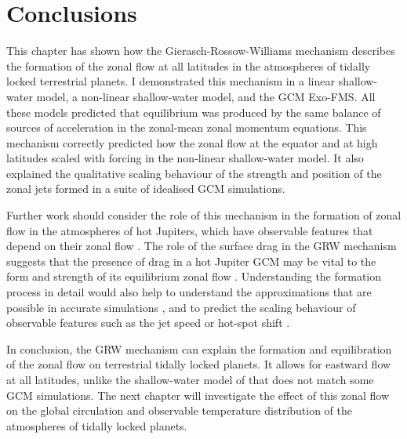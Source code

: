 \section{Conclusions}

This chapter has shown how the Gierasch-Rossow-Williams mechanism describes the formation of the zonal flow at all latitudes in the atmospheres of tidally locked terrestrial planets. I demonstrated this mechanism in a linear shallow-water model, a non-linear shallow-water model, and the GCM Exo-FMS. All these models predicted that equilibrium was produced by the same balance of sources of acceleration in the zonal-mean zonal momentum equations. This mechanism correctly predicted how the zonal flow at the equator and at high latitudes scaled with forcing in the non-linear shallow-water model. It also explained the qualitative scaling behaviour of the strength and position of the zonal jets formed in a suite of idealised GCM simulations.

Further work should consider the role of this mechanism in the formation of zonal flow in the atmospheres of hot Jupiters, which have observable features that depend on their zonal flow \citep{showman2015circulation}. The role of the surface drag in the GRW mechanism suggests that the presence of drag in a hot Jupiter GCM may be vital to the form and strength of its equilibrium zonal flow \citep{cho2015sensitivity}. Understanding the formation process in detail would also help to understand the approximations that are possible in accurate simulations \citep{mayne2019limits}, and to predict the scaling behaviour of observable features such as the jet speed or hot-spot shift \citep{zellem2014hd209, louden2015spatially}.

In conclusion, the GRW mechanism can explain the formation and equilibration of the zonal flow on terrestrial tidally locked planets. It allows for eastward flow at all latitudes, unlike the shallow-water model of \citet{showman2011superrotation} that does not match some GCM simulations. The next chapter will investigate the effect of this zonal flow on the global circulation and observable temperature distribution of the atmospheres of tidally locked planets.







% 
% 

